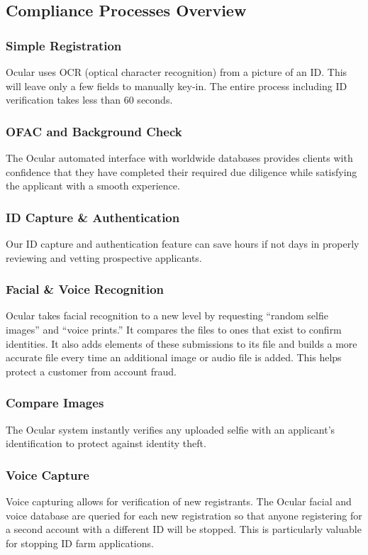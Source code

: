 \documentclass[12pt]{article}
\begin{document}
\subsection{Compliance Processes Overview}
\subsubsection*{Simple Registration}
Ocular uses OCR (optical character recognition) from a picture of an ID. This will leave only a few fields to manually key-in. The entire process including ID verification takes less than 60 seconds.

\subsubsection*{OFAC and Background Check}
The Ocular automated interface with worldwide databases provides clients with confidence that they have completed their required due diligence while satisfying the applicant with a smooth experience. 

\subsubsection*{ID Capture \& Authentication}
Our ID capture and authentication feature can save hours if not days in properly reviewing and vetting prospective applicants. 

\subsubsection*{Facial \& Voice Recognition}
Ocular takes facial recognition to a new level by requesting “random selfie images” and “voice prints.” It compares the files to ones that exist to confirm identities. It also adds elements of these submissions to its file and builds a more accurate file every time an additional image or audio file is added. This helps protect a customer from account fraud.

\subsubsection*{Compare Images}
The Ocular system instantly verifies any uploaded selfie with an applicant’s identification to protect against identity theft.

\subsubsection*{Voice Capture}
Voice capturing allows for verification of new registrants. The Ocular facial and voice database are queried for each new registration so that anyone registering for a second account with a different ID will be stopped. This is particularly valuable for stopping ID farm applications.
\end{document}
